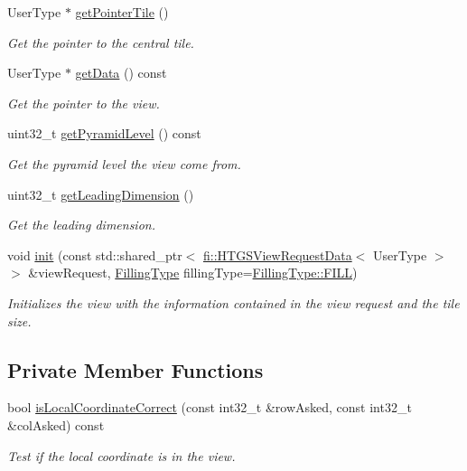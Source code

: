 \begin{DoxyCompactItemize}
User\+Type $\ast$ \hyperlink{classfi_1_1View_af386d23db727519b0016bb885061e5f4}{get\+Pointer\+Tile} ()
\begin{DoxyCompactList}\small\item\em Get the pointer to the central tile. \end{DoxyCompactList}\item 
User\+Type $\ast$ \hyperlink{classfi_1_1View_a8fd719fcea9c7a98cfd0feba96fe5afe}{get\+Data} () const
\begin{DoxyCompactList}\small\item\em Get the pointer to the view. \end{DoxyCompactList}\item 
uint32\+\_\+t \hyperlink{classfi_1_1View_a0e586b5f01729eb97c6358b02426c50b}{get\+Pyramid\+Level} () const
\begin{DoxyCompactList}\small\item\em Get the pyramid level the view come from. \end{DoxyCompactList}\item 
uint32\+\_\+t \hyperlink{classfi_1_1View_aafc262cff3e6af06f7c626bc4a0da4cf}{get\+Leading\+Dimension} ()
\begin{DoxyCompactList}\small\item\em Get the leading dimension. \end{DoxyCompactList}\item 
void \hyperlink{classfi_1_1View_a45cf9767af7b68e813e166d24acab720}{init} (const std\+::shared\+\_\+ptr$<$ \hyperlink{classfi_1_1HTGSViewRequestData}{fi\+::\+H\+T\+G\+S\+View\+Request\+Data}$<$ User\+Type $>$$>$ \&view\+Request, \hyperlink{namespacefi_a6808b618c85d179a330ca388162215bd}{Filling\+Type} filling\+Type=\hyperlink{namespacefi_a6808b618c85d179a330ca388162215bdae8225b11842409df543692aebed34fd1}{Filling\+Type\+::\+F\+I\+LL})
\begin{DoxyCompactList}\small\item\em Initializes the view with the information contained in the view request and the tile size. \end{DoxyCompactList}\end{DoxyCompactItemize}
\subsection*{Private Member Functions}
\begin{DoxyCompactItemize}
\item 
bool \hyperlink{classfi_1_1View_a227f31e08d755d67e364967ceb3a1758}{is\+Local\+Coordinate\+Correct} (const int32\+\_\+t \&row\+Asked, const int32\+\_\+t \&col\+Asked) const
\begin{DoxyCompactList}\small\item\em Test if the local coordinate is in the view. \end{DoxyCompactList}\end{DoxyCompactItemize}
